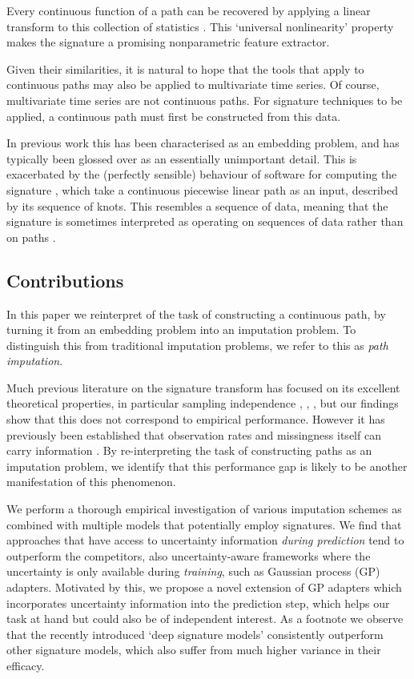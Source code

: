 \documentclass{article}
\begin{document}
Every continuous function of a path can be recovered by applying a linear transform to this collection of statistics \cite[Proposition A.6]{kidger2019deep}. This `universal nonlinearity' property makes the signature a promising nonparametric feature extractor.

Given their similarities, it is natural to hope that the tools that apply to continuous paths may also be applied to multivariate time series. Of course, multivariate time series are not continuous paths. For signature techniques to be applied, a continuous path must first be constructed from this data.

In previous work \cite{kidger2019deep, levin2013, fermanian2019embedding} this has been characterised as an embedding problem, and has typically been glossed over as an essentially unimportant detail. This is exacerbated by the (perfectly sensible) behaviour of software for computing the signature \cite{iisignature, signatory}, which take a continuous piecewise linear path as an input, described by its sequence of knots. This resembles a sequence of data, meaning that the signature is sometimes interpreted as operating on sequences of data rather than on paths \cite{kidger2019deep, levin2013}.

\subsection{Contributions}
In this paper we reinterpret of the task of constructing a continuous path, by turning it from an embedding problem into an imputation problem. To distinguish this from traditional imputation problems, we refer to this as \emph{path imputation}.

Much previous literature on the signature transform has focused on its excellent theoretical properties, in particular sampling independence \cite[Proposition A.7]{kidger2019deep}, \cite{signatorydocumentation}, \cite[Section 2]{toth2019gp}, but our findings show that this does not correspond to empirical performance. However it has previously been established that observation rates and missingness itself can carry information \cite{rubin1976inference, gelman2007dataanalysis}. By re-interpreting the task of constructing paths as an imputation problem, we identify that this performance gap is likely to be another manifestation of this phenomenon.

We perform a thorough empirical investigation of various imputation schemes as combined with multiple models that potentially employ signatures. We find that approaches that have access to uncertainty information \emph{during prediction} tend to outperform the competitors, also uncertainty-aware frameworks where the uncertainty is only available during \emph{training}, such as Gaussian process (GP) adapters.
Motivated by this, we propose a novel extension of GP adapters \cite{li2016scalable, futoma2017mgp} which incorporates uncertainty information into the prediction step, which helps our task at hand but could also be of independent interest.
As a footnote we observe that the recently introduced `deep signature models' \cite{kidger2019deep} consistently outperform other signature models, which also suffer from much higher variance in their efficacy.
\end{document}
